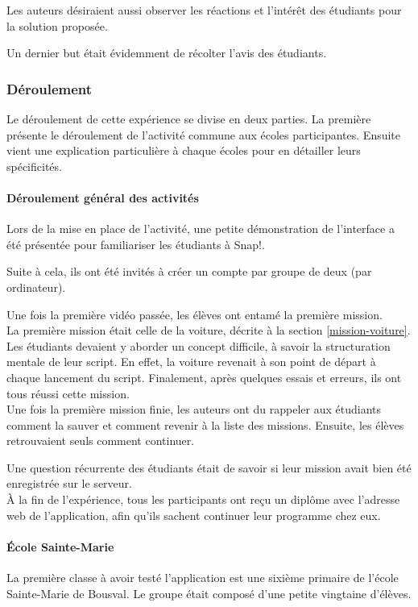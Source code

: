 Les auteurs désiraient aussi observer les réactions et l'intérêt des étudiants pour la solution proposée.

Un dernier but était évidemment de récolter l'avis des étudiants. 

\subsubsection{Déroulement}
Le déroulement de cette expérience se divise en deux parties. La première présente le déroulement de l'activité commune aux écoles participantes. Ensuite vient une explication particulière à chaque écoles pour en détailler leurs spécificités.
\paragraph{Déroulement général des activités}
Lors de la mise en place de l'activité, une petite démonstration de l'interface a été présentée pour familiariser les étudiants à Snap!. 

Suite à cela, ils ont été invités à créer un compte par groupe de deux (par ordinateur).

Une fois la première vidéo passée, les élèves ont entamé la première mission.\\

La première mission était celle de la voiture, décrite à la section \ref{mission-voiture}. Les étudiants devaient y aborder un concept difficile, à savoir la structuration mentale de leur script. En effet, la voiture revenait à son point de départ à chaque lancement du script. Finalement, après quelques essais et erreurs, ils ont tous réussi cette mission.\\

Une fois la première mission finie, les auteurs ont du rappeler aux étudiants comment la sauver et comment revenir à la liste des missions. Ensuite, les élèves retrouvaient seuls comment continuer. 

Une question récurrente des étudiants était de savoir si leur mission avait bien été enregistrée sur le serveur.\\

À la fin de l'expérience, tous les participants ont reçu un diplôme avec l'adresse web de l'application, afin qu'ils sachent continuer leur programme chez eux.

\paragraph{École Sainte-Marie} 
La première classe à avoir testé l'application est une sixième primaire de l'école Sainte-Marie de Bousval. Le groupe était composé d'une petite vingtaine d'élèves.


